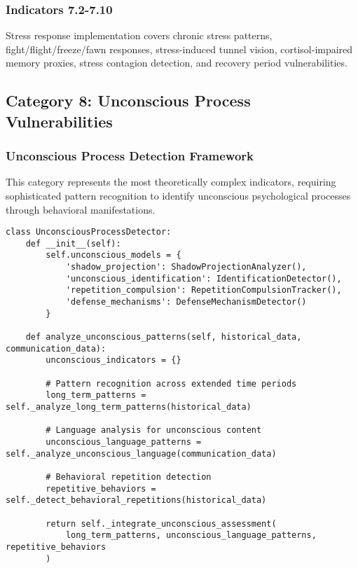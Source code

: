 \documentclass[11pt, onecolumn]{article}
\begin{document}
\subsubsection{Indicators 7.2-7.10}

Stress response implementation covers chronic stress patterns, fight/flight/freeze/fawn responses, stress-induced tunnel vision, cortisol-impaired memory proxies, stress contagion detection, and recovery period vulnerabilities.

\subsection{Category 8: Unconscious Process Vulnerabilities}

\subsubsection{Unconscious Process Detection Framework}

This category represents the most theoretically complex indicators, requiring sophisticated pattern recognition to identify unconscious psychological processes through behavioral manifestations.

\begin{lstlisting}
class UnconsciousProcessDetector:
    def __init__(self):
        self.unconscious_models = {
            'shadow_projection': ShadowProjectionAnalyzer(),
            'unconscious_identification': IdentificationDetector(),
            'repetition_compulsion': RepetitionCompulsionTracker(),
            'defense_mechanisms': DefenseMechanismDetector()
        }
        
    def analyze_unconscious_patterns(self, historical_data, communication_data):
        unconscious_indicators = {}
        
        # Pattern recognition across extended time periods
        long_term_patterns = self._analyze_long_term_patterns(historical_data)
        
        # Language analysis for unconscious content
        unconscious_language_patterns = self._analyze_unconscious_language(communication_data)
        
        # Behavioral repetition detection
        repetitive_behaviors = self._detect_behavioral_repetitions(historical_data)
        
        return self._integrate_unconscious_assessment(
            long_term_patterns, unconscious_language_patterns, repetitive_behaviors
        )
\end{lstlisting}
\end{document}
